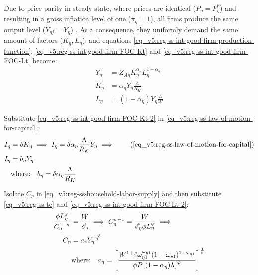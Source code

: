 \documentclass[../thesis.tex]{subfiles}
\begin{document}
Due to price parity in steady state, where prices are identical ($P_{\eta} = P_{\eta}^{\ast}$) and resulting in a gross inflation level of one ($\pi_{\eta} = 1$), all firms produce the same output level ($Y_{\eta j} = Y_{\eta}$) \cite[Lecture 13, p.12]{solis-garcia_ucb_2022}. As a consequence, they uniformly demand the same amount of factors ($K_{\eta}, L_{\eta}$), and equations \ref{eq_v5:reg-ss-int-good-firm-production-function}, \ref{eq_v5:reg-ss-int-good-firm-FOC-Kt} and \ref{eq_v5:reg-ss-int-good-firm-FOC-Lt} become: %
\begin{align}
	Y_{\eta} &= Z_{A\eta} K_{\eta}^{\alpha_{\eta}} L_{\eta}^{1 -{\alpha_{\eta}}} \label{eq_v5:reg-ss-int-good-firm-production-function-2} \\	
	K_{\eta} &= {\alpha_{\eta}} Y_{\eta} \frac{\Lambda_{}}{R_K} \label{eq_v5:reg-ss-int-good-firm-FOC-Kt-2} \\
	L_{\eta} &= (1-\alpha_{\eta}) Y_{\eta} \frac{\Lambda_{}}{W} \label{eq_v5:reg-ss-int-good-firm-FOC-Lt-2}
\end{align}
	
	Substitute \ref{eq_v5:reg-ss-int-good-firm-FOC-Kt-2} in \ref{eq_v5:reg-ss-law-of-motion-for-capital}:
	\begin{align}
		I_{\eta} &= \delta K_{\eta} \implies I_{\eta} = \delta {\alpha_{\eta}} \frac{\Lambda_{}}{R_K} Y_{\eta} \implies \tag{\ref{eq_v5:reg-ss-law-of-motion-for-capital}} \\
		I_{\eta} &= b_{\eta} Y_{\eta} \label{eq_v5:reg-ss-investment} \\
		& \text{where:} \quad b_{\eta} = \delta {\alpha_{\eta}} \frac{\Lambda_{}}{R_K} \label{eq_v5:reg-ss-b-eta}
	\end{align}
	
	Isolate $C_{\eta}$ in \ref{eq_v5:reg-ss-household-labor-supply} and then substitute \ref{eq_v5:reg-ss-te} and \ref{eq_v5:reg-ss-int-good-firm-FOC-Lt-2}:
	\begin{align}
		\frac{\phi L_{\eta}^{\varphi}}{C_{\eta}^{1-\sigma}} &= \frac{W}{\te[]} \implies C_{\eta}^{\sigma -1} = \frac{W}{\te[] \phi L_{\eta}^{\varphi}} \implies \nonumber\\
		C_{\eta} &= a_{\eta} Y_{\eta}^{\frac{-\varphi}{\sigma}} \label{eq_v5:reg-ss-consumption} \\
		& \text{where:} \quad a_{\eta} = \left[ \frac{W^{1 +\varphi} \omega_{\eta 1}^{\omega_{\eta 1}} (1 -\omega_{\eta 1})^{1 -\omega_{\eta 1}}}{\phi P_{} \left[ (1 -\alpha_{\eta}) \Lambda_{} \right]^{\varphi}} \right]^{\frac{1}{\sigma}} \label{eq_v5:reg-ss-a-eta}
	\end{align}
\end{document}
